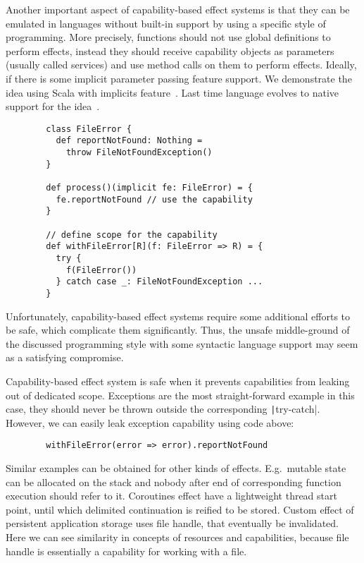 \documentclass[conference]{IEEEtran}
\begin{document}
    Another important aspect of capability-based effect systems is that they can be emulated in languages without built-in support by using a specific style of programming.
    More precisely, functions should not use global definitions to perform effects, instead they should receive capability objects as parameters (usually called services) and use method calls on them to perform effects.
    Ideally, if there is some implicit parameter passing feature support.
    We demonstrate the idea using Scala with implicits feature~\cite{odersky2004scala}.
    Last time language evolves to native support for the idea~\cite{odersky2021safer}.
    \begin{verbatim}
        class FileError {
          def reportNotFound: Nothing =
            throw FileNotFoundException()
        }

        def process()(implicit fe: FileError) = {
          fe.reportNotFound // use the capability
        }

        // define scope for the capability
        def withFileError[R](f: FileError => R) = {
          try {
            f(FileError())
          } catch case _: FileNotFoundException ...
        }
    \end{verbatim}

    Unfortunately, capability-based effect systems require some additional efforts to be safe, which complicate them significantly.
    Thus, the unsafe middle-ground of the discussed programming style with some syntactic language support may seem as a satisfying compromise.

    Capability-based effect system is safe when it prevents capabilities from leaking out of dedicated scope.
    Exceptions are the most straight-forward example in this case, they should never be thrown outside the corresponding \texttt|try-catch|.
    However, we can easily leak exception capability using code above:
    \begin{verbatim}
        withFileError(error => error).reportNotFound
    \end{verbatim}

    Similar examples can be obtained for other kinds of effects.
    E.g.\ mutable state can be allocated on the stack and nobody after end of corresponding function execution should refer to it.
    Coroutines effect have a lightweight thread start point, until which delimited continuation is reified to be stored.
    Custom effect of persistent application storage uses file handle, that eventually be invalidated.
    Here we can see similarity in concepts of resources and capabilities, because file handle is essentially a capability for working with a file.
\end{document}
